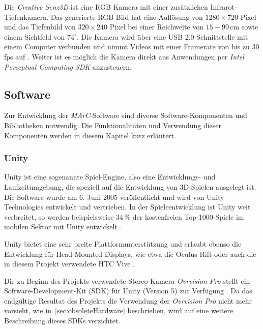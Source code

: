 Die \textit{Creative Senz3D} ist eine RGB Kamera mit einer zusätzlichen Infrarot-Tiefenkamera. Das generierte RGB-Bild hat eine Auflösung von $1280\times720$ Pixel und das Tiefenbild von $320\times240$ Pixel bei einer Reichweite von $15-99\,$cm sowie einem Sichtfeld von $74^\circ$. Die Kamera wird über eine USB 2.0 Schnittstelle mit einem Computer verbunden und nimmt Videos mit einer Framerate von bis zu $30$ fps auf \cite{website:Senz3d}. Weiter ist es möglich die Kamera direkt aus Anwendungen per \textit{Intel Perceptual Computing SDK} anzusteuern.

\subsection{Software} 

Zur Entwicklung der \textit{MArC}-Software sind diverse Software-Komponenten und Bibliotheken notwendig. Die Funktionalitäten und Verwendung dieser Komponenten werden in diesem Kapitel kurz erläutert.


\subsubsection{Unity}\label{sec:unity}

Unity ist eine sogenannte Spiel-Engine, also eine Entwicklungs- und Laufzeitumgebung, die speziell auf die Entwicklung von 3D-Spielen ausgelegt ist. Die Software wurde am 6. Juni 2005 veröffentlicht \cite{haas2014history} und wird von Unity Technologies \cite{website:Unity} entwickelt und vertrieben. In der Spieleentwicklung ist Unity weit verbreitet, so werden beispielsweise $34\,\%$ der kostenfreien Top-1000-Spiele im mobilen Sektor mit Unity entwickelt \cite{website:UnityPR}.

Unity bietet eine sehr breite Plattformunterstützung \cite{website:UnityMultiPlatform} und erlaubt ebenso die Entwicklung für Head-Mounted-Displays, wie etwa die Oculus Rift \cite{website:UnityOculus}\cite{website:UnityVRoverview} oder auch die in diesem Projekt verwendete HTC Vive \cite{website:UnityVRoverview}.

Die zu Beginn des Projekts verwendete Stereo-Kamera \emph{Ovrvision Pro} stellt ein Software-Development-Kit (SDK) für Unity (Version 5) zur Verfügung \cite{website:ovrvisionSetup}. Da das endgültige Resultat des Projekts die Verwendung der \emph{Ovrvision Pro} nicht mehr vorsieht, wie in~\ref{sec:obsoleteHardware} beschrieben, wird auf eine weitere Beschreibung dieses SDKs verzichtet.


